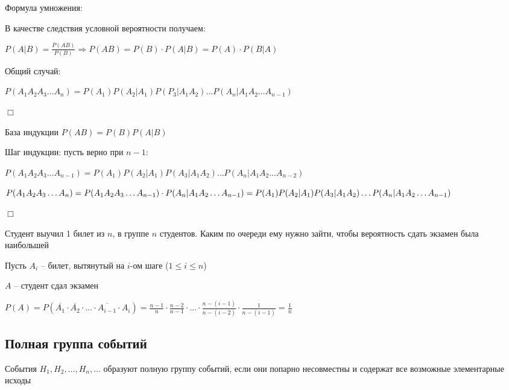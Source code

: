 \documentclass[12pt]{article}
\begin{document}
    \hypertarget{eventsmultiplicationformula}{}

    Формула умножения:

    В качестве следствия условной вероятности получаем:

    $P(A|B) = \frac{P(AB)}{P(B)} \Longrightarrow P(AB) = P(B) \cdot P(A|B) = P(A) \cdot P(B|A)$

    Общий случай:

    $P(A_1 A_2 A_3 \dots A_n) = P(A_1) P(A_2 | A_1) P(P_3 | A_1 A_2) \dots P(A_n | A_1 A_2 \dots A_{n - 1})$

    \begin{tcolorbox}
        $\Box$

        База индукции $P(AB) = P(B) P(A|B)$

        Шаг индукции: пусть верно при $n - 1$:

        $P(A_1 A_2 A_3 \dots A_{n - 1}) = P(A_1) P(A_2 | A_1) P(A_3 | A_1 A_2) \dots P(A_n | A_1 A_2 \dots A_{n - 2})$

        $P(A_1 A_2 A_3 \dots A_n) = P(A_1 A_2 A_3 \dots A_{n - 1}) \cdot P(A_n | A_1 A_2 \dots A_{n - 1}) = \\
        P(A_1) P(A_2 | A_1) P(A_3 | A_1 A_2) \dots P(A_n | A_1 A_2 \dots A_{n - 1})$

        $\Box$
    \end{tcolorbox}


    \Ex Студент выучил 1 билет из $n$, в группе $n$ студентов. Каким по очереди ему нужно зайти, чтобы вероятность сдать экзамен была наибольшей

    Пусть $A_i$ -- билет, вытянутый на $i$-ом шаге ($1 \leq i \leq n$)

    $A$ -- студент сдал экзамен

    $P(A) = P(\overline{A_1} \cdot \overline{A_2} \cdot \dots \cdot \overline{A_{i - 1}} \cdot A_i) = \frac{n - 1}{n} \cdot \frac{n - 2}{n - 1} \cdot \dots \cdot \frac{n - (i - 1)}{n - (i - 2)} \cdot \frac{1}{n - (i - 1)} = \frac{1}{n}$

    \hypertarget{completegroupofevents}{}

    \subsection{Полная группа событий}

    \Def События $H_1, H_2, \dots, H_n, \dots$ образуют полную группу событий, если они попарно несовместны и содержат все возможные элементарные исходы
\end{document}
